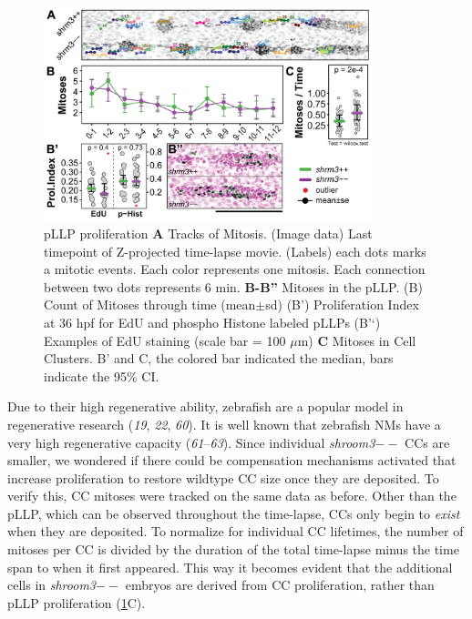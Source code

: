 \documentclass[11pt,singlespacinge,twoside]{reedthesis} %
\begin{document}
\begin{figure}

{\centering \includegraphics[width=0.85\textwidth]{figures/results/02_proliferation/prol-01} 

}

\caption[pLLP proliferation]{pLLP proliferation \textbf{A} Tracks of Mitosis. (Image data) Last timepoint of Z-projected time-lapse movie. (Labels) each dots marks a mitotic events. Each color represents one mitosis. Each connection between two dots represents 6 min. \textbf{B-B''} Mitoses in the pLLP. (B) Count of Mitoses through time (mean\(\pm\)sd) (B') Proliferation Index at 36 hpf for EdU and phospho Histone labeled pLLPs (B'`) Examples of EdU staining (scale bar = 100 \(\mu\)m) \textbf{C} Mitoses in Cell Clusters. B' and C, the colored bar indicated the median, bars indicate the 95\% CI.}\label{fig:prolpllp}
\end{figure}
Due to their high regenerative ability, zebrafish are a popular model in regenerative research (\emph{19}, \emph{22}, \emph{60}). It is well known that zebrafish NMs have a very high regenerative capacity (\emph{61}--\emph{63}). Since individual \emph{shroom3}\(--\) CCs are smaller, we wondered if there could be compensation mechanisms activated that increase proliferation to restore wildtype CC size once they are deposited. To verify this, CC mitoses were tracked on the same data as before. Other than the pLLP, which can be observed throughout the time-lapse, CCs only begin to \emph{exist} when they are deposited. To normalize for individual CC lifetimes, the number of mitoses per CC is divided by the duration of the total time-lapse minus the time span to when it first appeared. This way it becomes evident that the additional cells in \emph{shroom3}\(--\) embryos are derived from CC proliferation, rather than pLLP proliferation (\ref{fig:prolpllp}C).
\end{document}
